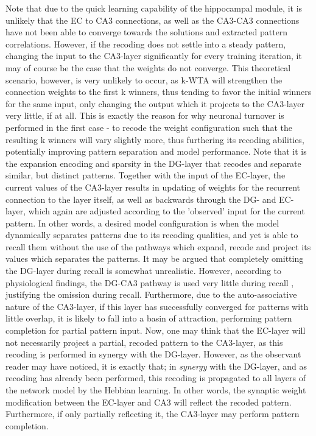 Note that due to the quick learning capability of the hippocampal module, it is unlikely that the EC to CA3 connections, as well as the CA3-CA3 connections have not been able to converge towards the solutions and extracted pattern correlations. However, if the recoding does not settle into a steady pattern, changing the input to the CA3-layer significantly for every training iteration, it may of course be the case that the weights do not converge. This theoretical scenario, however, is very unlikely to occur, as k-WTA will strengthen the connection weights to the first k winners, thus tending to favor the initial winners for the same input, only changing the output which it projects to the CA3-layer very little, if at all. 
This is exactly the reason for why neuronal turnover is performed in the first case - to recode the weight configuration such that the resulting k winners will vary slightly more, thus furthering its recoding abilities, potentially improving pattern separation and model performance. Note that it is the expansion encoding and sparsity in the DG-layer that recodes and separate similar, but distinct patterns. Together with the input of the EC-layer, the current values of the CA3-layer results in updating of weights for the recurrent connection to the layer itself, as well as backwards through the DG- and EC-layer, which again are adjusted according to the 'observed' input for the current pattern. In other words, a desired model configuration is when the model dynamically separates patterns due to its recoding qualities, and yet is able to recall them without the use of the pathways which expand, recode and project its values which separates the patterns.
It may be argued that completely omitting the DG-layer during recall is somewhat unrealistic. 
However, according to physiological findings, the DG-CA3 pathway is used very little during recall \citep{Wakagi2008}, justifying the omission during recall. 
Furthermore, due to the auto-associative nature of the CA3-layer, if this layer has successfully converged for patterns with little overlap, it is likely to fall into a basin of attraction, performing pattern completion for partial pattern input. Now, one may think that the EC-layer will not necessarily project a partial, recoded pattern to the CA3-layer, as this recoding is performed in synergy with the DG-layer. However, as the observant reader may have noticed, it is exactly that; in \textit{synergy} with the DG-layer, and as recoding has already been performed, this recoding is propagated to all layers of the network model by the Hebbian learning. In other words, the synaptic weight modification between the EC-layer and CA3 will reflect the recoded pattern. Furthermore, if only partially reflecting it, the CA3-layer may perform pattern completion.

